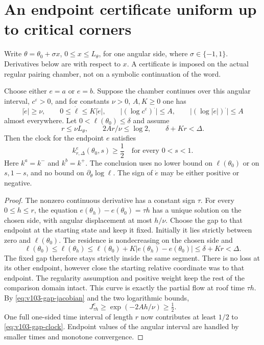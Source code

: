 \section{An endpoint certificate uniform up to critical corners}
\label{sec:v103-certificate}
Write $\theta=\theta_0+\sigma x$, $0\le x\le L_\theta$, for
one angular side, where $\sigma\in\{-1,1\}$. Derivatives below
are with respect to $x$. A certificate is imposed on the actual
regular pairing chamber, not on a symbolic continuation of the word.

\begin{theorem}
\label{thm:v103-certificate}
Choose either $e=a$ or $e=b$. Suppose the chamber continues over
this angular interval, $c^\varepsilon>0$, and for constants
$\nu>0$, $A,K\ge0$ one has
\begin{equation}\label{eq:v103-certificate-assumptions}
 |\dot e|\ge\nu,\qquad
 0\le\dot\ell\le K|\dot e|,\qquad
 |(\log c^\varepsilon)^{\boldsymbol\cdot}|\le A,
 \qquad |(\log|\dot e|)^{\boldsymbol\cdot}|\le A
\end{equation}
almost everywhere. Let $0<\ell(\theta_0)\le\delta$ and assume
\begin{equation}\label{eq:v103-certificate-scale}
 r\le\nu L_\theta,\qquad
 2Ar/\nu\le\log2,\qquad \delta+Kr<\Delta.
\end{equation}
Then the clock for the endpoint $e$ satisfies
\[
                  k_{r,\Delta}^{e}(\theta_0,s)\ge\frac12
                  \quad\text{for every }0<s<1.
\]
Here $k^a=k^-$ and $k^b=k^+$. The conclusion uses no lower bound
on $\ell(\theta_0)$ or on $s,1-s$, and no bound on
$\partial_\theta\log\ell$. The sign of $\dot e$ may be either
positive or negative.
\end{theorem}
\begin{proof}
The nonzero continuous derivative has a constant sign $\tau$.
For every $0\le h\le r$, the equation
$e(\theta_h)-e(\theta_0)=\tau h$ has a unique solution on the
chosen side, with angular displacement at most $h/\nu$.
Choose the gap to that endpoint at the starting state and keep it
fixed. Initially it lies strictly between zero and $\ell(\theta_0)$.
The residence is nondecreasing on the chosen side and
\[
 \ell(\theta_0)\le\ell(\theta_h)
 \le\ell(\theta_0)+K|e(\theta_h)-e(\theta_0)|
 \le\delta+Kr<\Delta.
\]
The fixed gap therefore stays strictly inside the same segment.
There is no loss at its other endpoint, however close the starting
relative coordinate was to that endpoint. The regularity assumption
and positive weight keep the rest of the comparison domain intact.
This curve is exactly the partial flow at roof time $\tau h$.
By \eqref{eq:v103-gap-jacobian} and the two logarithmic bounds,
\[
 J_{\tau h}^e\ge\exp(-2Ah/\nu)\ge\tfrac12.
\]
One full one-sided time interval of length $r$ now contributes at
least $1/2$ to \eqref{eq:v103-gap-clock}. Endpoint values of the
angular interval are handled by smaller times and monotone convergence.
\end{proof}

